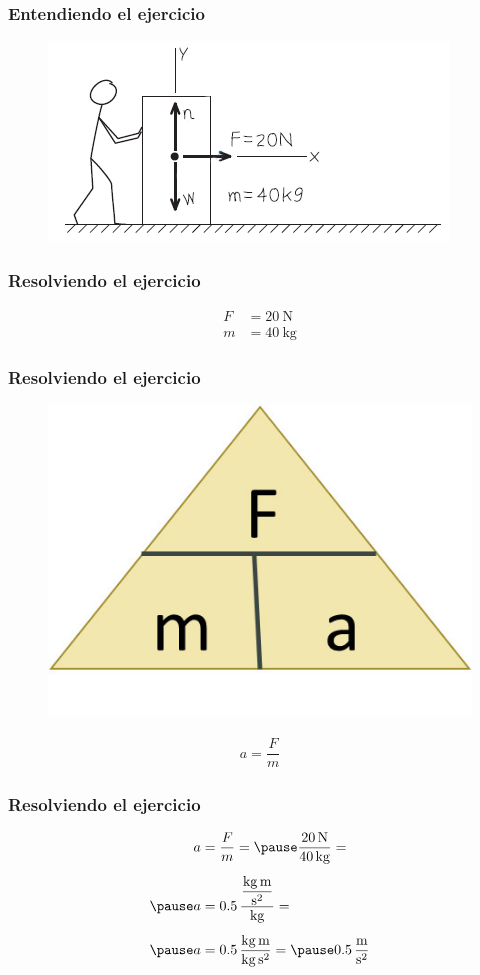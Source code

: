 \documentclass[14pt]{beamer}
\begin{document}
\begin{frame}
\frametitle{Entendiendo el ejercicio}
\begin{figure}
    \centering
    \includegraphics[scale=1]{Imagenes/Newton_02.png}
\end{figure}
\end{frame}
\begin{frame}
\frametitle{Resolviendo el ejercicio}
\pause
\begin{align*}
F &= \SI{20}{\newton} \\[0.5em]
m &= \SI{40}{\kilo\gram}
\end{align*}
\end{frame}
\begin{frame}
\frametitle{Resolviendo el ejercicio}
\pause
\begin{figure}
    \centering
    \includegraphics[scale=1]{Imagenes/Newton_11.jpg}
\end{figure}
\pause
\begin{align*}
a = \dfrac{F}{m}
\end{align*}
\end{frame}
\begin{frame}
\frametitle{Resolviendo el ejercicio}
\pause
\begin{eqnarray*}
\begin{aligned}
a &= \dfrac{F}{m} = \pause \dfrac{\SI{20}{\newton}}{\SI{40}{\kilo\gram}} = \\[0.5em] \pause
a &= 0.5 \, \dfrac{\dfrac{\si{\kilo\gram\meter}}{\si{\square\second}}}{\si{\kilo\gram}} = \\[0.5em] \pause 
a &= 0.5 \, \dfrac{\si{\kilo\gram\meter}}{\si{\kilo\gram\square\second}} = \pause \SI[per-mode=fraction]{0.5}{\meter\per\square\second}
\end{aligned}
\end{eqnarray*}
\end{frame}
\end{document}
